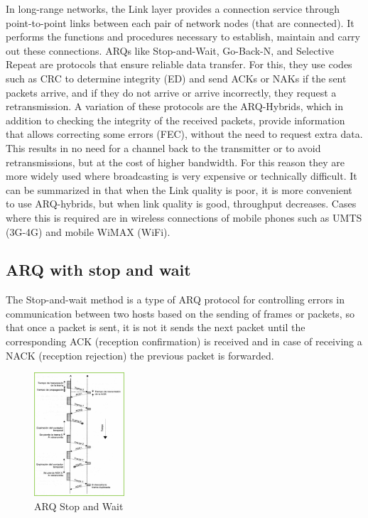 \documentclass[journal,trans]{IEEEtran}
\begin{document}
In long-range networks, the Link layer provides a connection service through point-to-point links between each pair of network nodes (that are connected). It performs the functions and procedures necessary to establish, maintain and carry out these connections.
\cite{caire2001throughput}
ARQs like Stop-and-Wait, Go-Back-N, and Selective Repeat are protocols that ensure reliable data transfer. For this, they use codes such as CRC to determine integrity (ED) and send ACKs or NAKs if the sent packets arrive, and if they do not arrive or arrive incorrectly, they request a retransmission.
A variation of these protocols are the ARQ-Hybrids, which in addition to checking the integrity of the received packets, provide information that allows correcting some errors (FEC), without the need to request extra data. This results in no need for a channel back to the transmitter or to avoid retransmissions, but at the cost of higher bandwidth. For this reason they are more widely used where broadcasting is very expensive or technically difficult. It can be summarized in that when the
Link quality is poor, it is more convenient to use ARQ-hybrids, but when link quality is good, throughput decreases. Cases where this is required are in wireless connections of mobile phones such as UMTS (3G-4G) and mobile WiMAX (WiFi).

\subsection{\textbf{ ARQ with stop and wait }}

The Stop-and-wait method is a type of ARQ protocol for controlling errors in communication between two hosts based on the sending of frames or packets, so that once a packet is sent, it is not it sends the next packet until the corresponding ACK (reception confirmation) is received and in case of receiving a NACK (reception rejection) the previous packet is forwarded.

\begin{figure}[h]
    \includegraphics[width=0.3\textwidth]{ARQ-SaW.jpg}
    \centering
    \caption{ARQ Stop and Wait}
    \label{fig:my_label2}
\end{figure}
\end{document}
